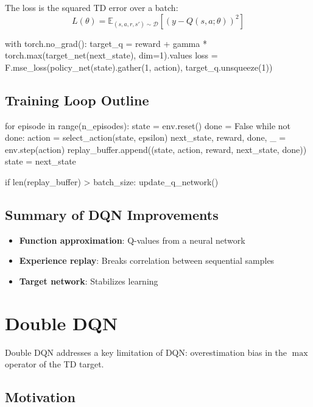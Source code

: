 \documentclass{article}
\begin{document}
The loss is the squared TD error over a batch:
\begin{equation}
    L(\theta) = \mathbb{E}_{(s,a,r,s') \sim \mathcal{D}} \left[ \left( y - Q(s,a;\theta) \right)^2 \right]
\end{equation}
\begin{python}
with torch.no_grad():
    target_q = reward + gamma * torch.max(target_net(next_state), dim=1).values
loss = F.mse_loss(policy_net(state).gather(1, action), target_q.unsqueeze(1))
\end{python}

\subsection{Training Loop Outline}

\begin{python}
for episode in range(n_episodes):
    state = env.reset()
    done = False
    while not done:
        action = select_action(state, epsilon)
        next_state, reward, done, _ = env.step(action)
        replay_buffer.append((state, action, reward, next_state, done))
        state = next_state

        if len(replay_buffer) > batch_size:
            update_q_network()
\end{python}

\subsection{Summary of DQN Improvements}

\begin{itemize}
    \item \textbf{Function approximation}: Q-values from a neural network
    \item \textbf{Experience replay}: Breaks correlation between sequential samples
    \item \textbf{Target network}: Stabilizes learning
\end{itemize}


\section{Double DQN}

Double DQN addresses a key limitation of DQN: overestimation bias in the $\max$ operator of the TD target.

\subsection{Motivation}
\end{document}
